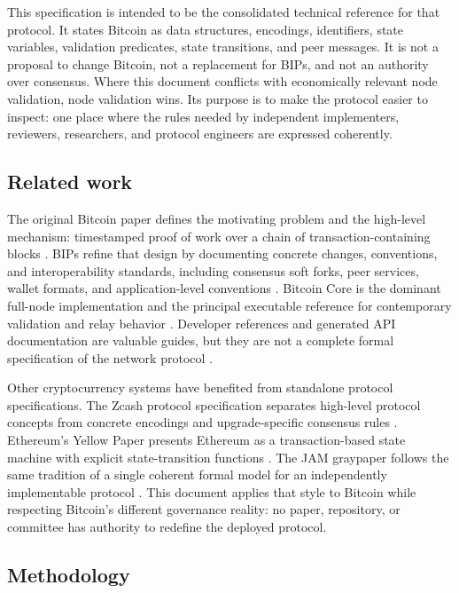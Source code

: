 This specification is intended to be the consolidated technical reference for
that protocol. It states Bitcoin as data structures, encodings, identifiers,
state variables, validation predicates, state transitions, and peer messages.
It is not a proposal to change Bitcoin, not a replacement for BIPs, and not an
authority over consensus. Where this document conflicts with economically
relevant node validation, node validation wins. Its purpose is to make the
protocol easier to inspect: one place where the rules needed by independent
implementers, reviewers, researchers, and protocol engineers are expressed
coherently.

\subsection{Related work}

The original Bitcoin paper defines the motivating problem and the high-level
mechanism: timestamped proof of work over a chain of transaction-containing
blocks \cite{nakamoto-bitcoin}. BIPs refine that design by documenting concrete
changes, conventions, and interoperability standards, including consensus soft
forks, peer services, wallet formats, and application-level conventions
\cite{bip-0123,bitcoin-bips-repo}. Bitcoin Core is the dominant full-node
implementation and the principal executable reference for contemporary
validation and relay behavior \cite{bitcoin-core,bitcoin-core-v31}.
Developer references and generated API documentation are valuable guides, but
they are not a complete formal specification of the network protocol
\cite{bitcoin-developer-reference}.

Other cryptocurrency systems have benefited from standalone protocol
specifications. The Zcash protocol specification separates high-level protocol
concepts from concrete encodings and upgrade-specific consensus rules
\cite{zcash-protocol-spec}. Ethereum's Yellow Paper presents Ethereum as a
transaction-based state machine with explicit state-transition functions
\cite{ethereum-yellowpaper}. The JAM graypaper follows the same tradition of a
single coherent formal model for an independently implementable protocol
\cite{graypaper-repo}. This document applies that style to Bitcoin while
respecting Bitcoin's different governance reality: no paper, repository, or
committee has authority to redefine the deployed protocol.

\subsection{Methodology}

